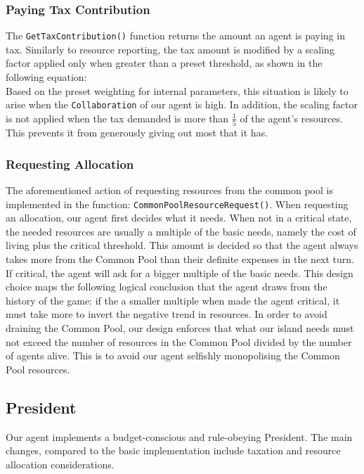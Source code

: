 \subsubsection{Paying Tax Contribution}
The \texttt{GetTaxContribution()} function returns the amount an agent is paying in tax. Similarly to resource reporting, the tax amount is modified by a scaling factor applied only when greater than a preset threshold, as shown in the following equation: 
\begin{equation}
    [1 + (Scaling \: Factor - Preset \: Threshold)]
\end{equation}
Based on the preset weighting for internal parameters, this situation is likely to arise when the \texttt{Collaboration} of our agent is high. In addition, the scaling factor is not applied when the tax demanded is more than $\frac{1}{5}$ of the agent's resources. This prevents it from generously giving out most that it has.

\subsubsection{Requesting Allocation}\label{subsubsection:CommonPoolResourceRequest()}

The aforementioned action of requesting resources from the common pool is implemented in the function: \texttt{CommonPoolResourceRequest()}. When requesting an allocation, our agent first decides what it needs. When not in a critical state, the needed resources are usually a multiple of the basic needs, namely the cost of living plus the critical threshold. This amount is decided so that the agent always takes more from the Common Pool than their definite expenses in the next turn. If critical, the agent will ask for a bigger multiple of the basic needs. This design choice maps the following logical conclusion that the agent draws from the history of the game: if the a smaller multiple when made the agent critical, it must take more to invert the negative trend in resources. In order to avoid draining the Common Pool, our design enforces that what our island needs must not exceed the number of resources in the Common Pool divided by the number of agents alive. This is to avoid our agent selfishly monopolising the Common Pool resources.

\subsection{President}
\label{subsec:team4:president}
Our agent implements a budget-conscious and rule-obeying President. The main changes, compared to the basic implementation include taxation and resource allocation considerations.

